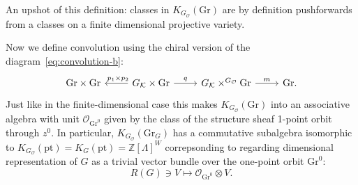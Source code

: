 \documentclass[11pt]{amsart}
\theoremstyle{definition}
\newcommand{\Kc}{\mathcal{K}}
\newcommand{\Gr}{\mathrm{Gr}}
\newcommand{\Oc}{\mathcal{O}}
\numberwithin{equation}{subsection}
\numberwithin{figure}{subsection}
\newcommand{\pt}{\mathrm{pt}}
\begin{document}
An upshot of this definition: classes in $K_{G_\Oc}(\Gr)$ are by definition pushforwards from a classes on a finite dimensional projective variety.

Now we define convolution using the chiral version of the diagram~\eqref{eq:convolution-b}:
\begin{equation}
\label{eq:convolution-gr}
\begin{tikzcd}
\Gr\times \Gr &   G_\Kc\times \Gr \arrow{l}[swap]{~p_1\times p_2}\arrow{r}{q} &  G_\Kc\times^{G_\Oc} \Gr \arrow{r}{m} & \Gr.
\end{tikzcd}
\end{equation}
Just like in the finite-dimensional case this makes $K_{G_\Oc}(\Gr)$ into an associative algebra with unit $\Oc_{\Gr^0}$ given by the class of the structure sheaf 1-point orbit through $z^0$. In particular, $K_{G_\Oc}(\Gr_G)$ has a commutative subalgebra isomorphic to $K_{G_\Oc}(\pt)=K_G(\pt)=\mathbb{Z}[\Lambda]^W$ correpsonding to regarding dimensional representation of $G$ as a trivial vector bundle over the one-point orbit $\Gr^0$:
$$
R(G)\ni V \mapsto \Oc_{\Gr^0}\otimes V.
$$
\end{document}
